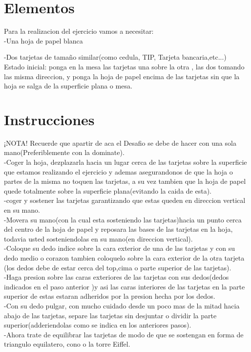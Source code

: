 \documentclass{article}
\begin{document}
\section{Elementos} \label{contenido}
Para la realizacion del ejercicio vamos a necesitar:\\

    -Una hoja de papel blanca
    
    -Dos tarjetas de tamaño similar(como cedula, TIP, Tarjeta bancaria,etc...)\\
    
    Estado inicial: ponga en la mesa las tarjetas una sobre la otra , las  dos tomando las misma direccion, y ponga la hoja de papel encima de las tarjetas sin que la hoja se salga de la superficie plana o mesa.

\section{Instrucciones} \label{contenido}
    ¡NOTA! Recuerde que apartir de aca el Desafio se debe de hacer con una sola mano(Preferiblemente con la dominate).\\
    
    
    -Coger la hoja, dezplazarla hacia un lugar cerca de las tarjetas sobre la superficie que estamos realizando el ejercicio y ademas asegurandonos de que la hoja o partes de la misma no toquen las tarjetas, a su vez tambien que la hoja de papel quede totalmente sobre la superficie plana(evitando la caida de esta).\\

    
    -coger y sostener las tarjetas garantizando que estas queden en direccion vertical en su mano.\\

    
    -Movera su mano(con la cual esta sosteniendo las tarjetas)hacia un punto cerca del centro de la hoja de papel  y reposara las bases de las tarjetas en la hoja, todavia    usted sosteniendolas en su mano(en direccion vertical).\\
 
    
    -Coloque su dedo indice sobre la cara exterior de una de las tarjetas y con su dedo medio o corazon tambien coloquelo sobre la cara exterior de la otra tarjeta (los dedos debe de estar cerca del top,cima  o parte superior de las tarjetas).\\

    
    -Haga presion sobre las caras exteriores de las tarjetas  con sus dedos(dedos indicados en el paso anterior )y asi las caras interiores de las tarjetas en la parte superior de estas estaran adheridos por la presion hecha por los dedos.\\
   
    
    -Con su dedo pulgar, con mucho cuidado desde un poco mas de la mitad hacia abajo de las tarjetas, separe las tarjetas sin desjuntar o dividir la parte superior(adderiendolas como se indica en los anteriores pasos).\\
    
    
    -Ahora    trate de equilibrar las tarjetas de modo de que se sostengan en forma de triangulo equilatero, cono o la torre Eiffel.\\
\end{document}
